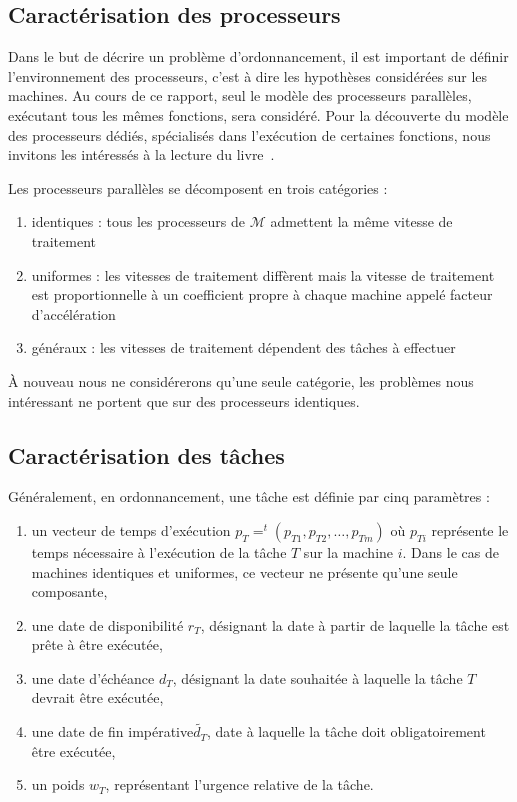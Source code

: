 \subsection{Caractérisation des processeurs}

Dans le but de décrire un problème d'ordonnancement, il est important de définir l'environnement des
processeurs, c'est à dire les hypothèses considérées sur les machines. Au cours de ce rapport, seul
le modèle des processeurs parallèles, exécutant tous les mêmes fonctions, sera considéré. Pour la
découverte du modèle des processeurs dédiés, spécialisés dans l'exécution de certaines fonctions,
nous invitons les intéressés à la lecture du livre~\cite{blazewicz_handbook_2007}.

Les processeurs parallèles se décomposent en trois catégories :
\begin{enumerate}
    \item identiques : tous les processeurs de $\mathcal{M}$ admettent la même vitesse de traitement
    \item uniformes : les vitesses de traitement diffèrent mais la vitesse de traitement est
        proportionnelle à un coefficient propre à chaque machine appelé facteur d'accélération
    \item généraux : les vitesses de traitement dépendent des tâches à effectuer
\end{enumerate}

À nouveau nous ne considérerons qu'une seule catégorie, les problèmes nous intéressant ne portent
que sur des processeurs identiques.

\subsection{Caractérisation des tâches}

Généralement, en ordonnancement, une tâche est définie par cinq paramètres :
\begin{enumerate}
    \item un vecteur de temps d'exécution $p_T = ^t(p_{T1}, p_{T2}, \dots, p_{Tm})$ où $p_{Ti}$
        représente le temps nécessaire à l'exécution de la tâche $T$ sur la machine $i$. Dans le cas
        de machines identiques et uniformes, ce vecteur ne présente qu'une seule composante,
    \item une date de disponibilité $r_T$, désignant la date à partir de laquelle la tâche est prête
        à être exécutée,
    \item une date d'échéance $d_T$, désignant la date souhaitée à laquelle la tâche $T$ devrait
        être exécutée,
    \item une date de fin impérative$\widetilde{d_T}$, date à laquelle la tâche doit obligatoirement être exécutée,
    \item un poids $w_T$, représentant l'urgence relative de la tâche.
\end{enumerate}

